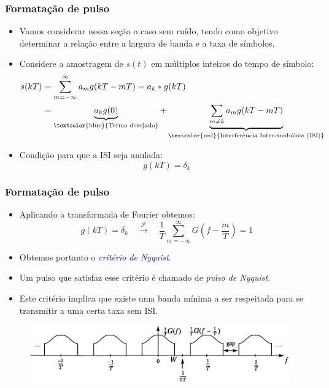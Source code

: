 \begin{frame}
	\frametitle{Formatação de pulso}

	\begin{itemize}
	    \item Vamos considerar nessa seção o caso sem ruído, tendo como objetivo determinar a relação entre a largura de banda e a taxa de símbolos.
	    \item Considere a amostragem de $s(t)$ em múltiplos inteiros do tempo de símbolo:
	    \begin{align*}
		s(kT) &= \sum\limits_{m=-\infty}^{\infty} a_m g(kT-mT) = a_k * g(kT) \\
		&= \underbrace{a_k g(0)}_{\text{\textcolor{blue}{Termo desejado}}} + \underbrace{\sum\limits_{m\neq k} a_m g(kT-mT)}_{\text{\textcolor{red}{Interferência Inter-simbólica (ISI)}}}
	    \end{align*}
	    \item Condição para que a ISI seja anulada:
	    \begin{equation*}
		    g(kT) = \delta_k
	    \end{equation*}
	\end{itemize}			
\end{frame}

\begin{frame}
	\frametitle{Formatação de pulso}

	\begin{itemize}
	    \item Aplicando a transformada de Fourier obtemos:
	    \begin{equation*}
		    g(kT) = \delta_k \quad \xrightarrow{\mathcal{F}} \quad \frac{1}{T}\sum\limits_{m=-\infty}^{\infty} G\left(f-\frac{m}{T} \right) = 1
	    \end{equation*}
	    \item Obtemos portanto o \textcolor{blue}{\textit{critério de Nyquist}}.
	    \item Um pulso que satisfaz esse critério é chamado de \textit{pulso de Nyquist}.
	    \item Este critério implica que existe uma banda mínima a ser respeitada para se transmitir a uma certa taxa sem ISI.
	\end{itemize}			
	\begin{figure}[t]	
	  \begin{center}
	    \includegraphics[width=\columnwidth]{figs/pam_03}
	  \end{center}
	\end{figure}
\end{frame}

